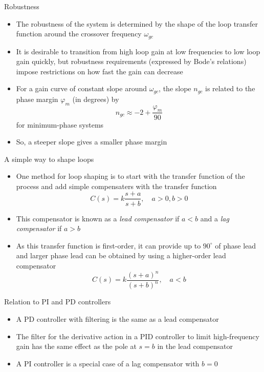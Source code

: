 \documentclass{beamer-control}
\begin{document}
\begin{frame}{Robustness}
\begin{itemize}
	\item The robustness of the system is determined by the shape of the loop transfer function around the crossover frequency $\omega_{gc}$
	\item It is desirable to transition from high loop gain at low frequencies to low loop gain quickly, but robustness requirements (expressed by Bode's relations) impose restrictions on how fast the gain can decrease
	\item For a gain curve of constant slope around $\omega_{gc}$, the slope $n_{gc}$ is related to the phase margin $\varphi_m$ (in degrees) by
	\[n_{gc} \approx -2 + \frac{\varphi_m}{90}\]
	for minimum-phase systems
	\item So, a steeper slope gives a smaller phase margin
\end{itemize}
\end{frame}



\begin{frame}{A simple way to shape loops}
\begin{itemize}
\item One method for loop shaping is to start with the transfer function of the process and add simple compensaters with the transfer function
\[C(s)=k\frac{s+a}{s+b}, \quad a>0, b>0\]
\item This compensator is known as a \textit{lead compensator} if $a<b$ and a \textit{lag compensator} if $a>b$
\item As this transfer function is first-order, it can provide up to $90^\circ$ of phase lead and larger phase lead can be obtained by using a higher-order lead compensator
\[C(s)=k\frac{(s+a)^n}{(s+b)^n}, \quad a<b\]
\end{itemize}
\end{frame}

\begin{frame}{Relation to PI and PD controllers}
\begin{itemize}
	\item A PD controller with filtering is the same as a lead compensator
	\item The filter for the derivative action in a PID controller to limit high-frequency gain has the same effect as the pole at $s=b$ in the lead compensator
	\item A PI controller is a special case of a lag compensator with $b=0$
\end{itemize}
\end{frame}
\end{document}
